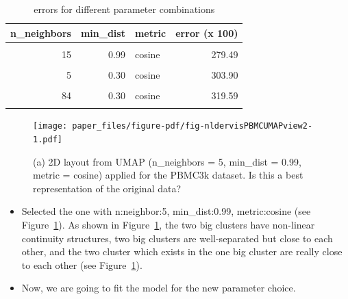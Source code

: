 \documentclass[
  12pt]{article}
\begin{document}
\begin{table}[H]

\caption{errors for different parameter combinations}
\centering
\begin{tabular}[t]{r|r|l|r}
\hline
\textbf{n\_neighbors} & \textbf{min\_dist} & \textbf{metric} & \textbf{error (x 100)}\\
\hline
\cellcolor{gray!6}{5} & \cellcolor{gray!6}{0.99} & \cellcolor{gray!6}{cosine} & \cellcolor{gray!6}{262.18}\\
\hline
15 & 0.99 & cosine & 279.49\\
\hline
\cellcolor{gray!6}{84} & \cellcolor{gray!6}{0.99} & \cellcolor{gray!6}{cosine} & \cellcolor{gray!6}{295.64}\\
\hline
5 & 0.30 & cosine & 303.90\\
\hline
\cellcolor{gray!6}{15} & \cellcolor{gray!6}{0.30} & \cellcolor{gray!6}{cosine} & \cellcolor{gray!6}{308.97}\\
\hline
84 & 0.30 & cosine & 319.59\\
\hline
\textcolor{red}{\textbf{\cellcolor{gray!6}{30}}} & \textcolor{red}{\textbf{\cellcolor{gray!6}{0.30}}} & \textcolor{red}{\textbf{\cellcolor{gray!6}{cosine}}} & \textcolor{red}{\textbf{\cellcolor{gray!6}{386.35}}}\\
\hline
\end{tabular}
\end{table}

\begin{figure}[H]

{\centering \texttt{[image: paper\_files/figure-pdf/fig-nldervisPBMCUMAPview2-1.pdf]}

}

\caption{\label{fig-nldervisPBMCUMAPview2}(a) 2D layout from UMAP
(n\_neighbors = 5, min\_dist = 0.99, metric = cosine) applied for the
PBMC3k dataset. Is this a best representation of the original data?}

\end{figure}

\begin{itemize}
\item
  Selected the one with n:neighbor:5, min\_dist:0.99, metric:cosine (see
  Figure~\ref{fig-nldervisPBMCUMAPview2}). As shown in
  Figure~\ref{fig-nldervisPBMCUMAPview2}, the two big clusters have
  non-linear continuity structures, two big clusters are well-separated
  but close to each other, and the two cluster which exists in the one
  big cluster are really close to each other (see
  Figure~\ref{fig-nldervisPBMCUMAPview2}).
\item
  Now, we are going to fit the model for the new parameter choice.
\end{itemize}
\end{document}

